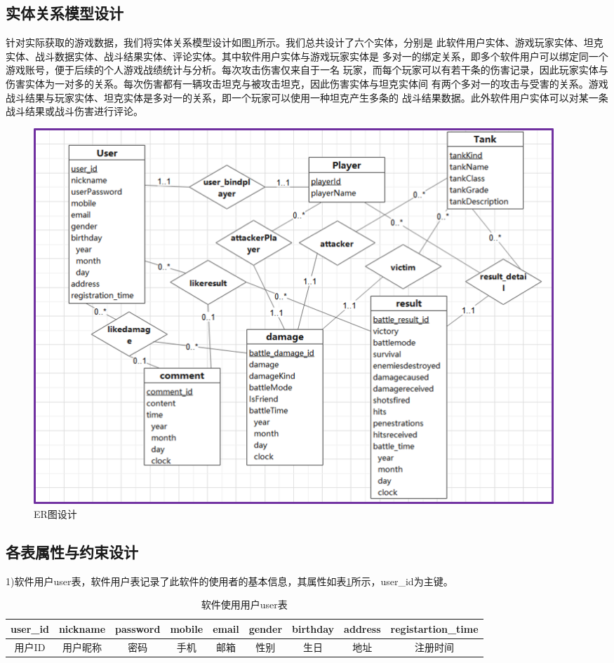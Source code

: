 \documentclass[UTF8, a4paper]{ctexart}
\begin{document}
\subsection{实体关系模型设计}
针对实际获取的游戏数据，我们将实体关系模型设计如图\ref{fig:erd}所示。我们总共设计了六个实体，分别是
此软件用户实体、游戏玩家实体、坦克实体、战斗数据实体、战斗结果实体、评论实体。其中软件用户实体与游戏玩家实体是
多对一的绑定关系，即多个软件用户可以绑定同一个游戏账号，便于后续的个人游戏战绩统计与分析。每次攻击伤害仅来自于一名
玩家，而每个玩家可以有若干条的伤害记录，因此玩家实体与伤害实体为一对多的关系。每次伤害都有一辆攻击坦克与被攻击坦克，因此伤害实体与坦克实体间
有两个多对一的攻击与受害的关系。游戏战斗结果与玩家实体、坦克实体是多对一的关系，即一个玩家可以使用一种坦克产生多条的
战斗结果数据。此外软件用户实体可以对某一条战斗结果或战斗伤害进行评论。
 \begin{figure}[h] %
    \centering
    \includegraphics[width=0.95\textwidth]{erd.png}
    \caption{ER图设计}
    \label{fig:erd}
  \end{figure}
\subsection{各表属性与约束设计}

1)软件用户user表，软件用户表记录了此软件的使用者的基本信息，其属性如表\ref{tab:user}所示，user\_id为主键。
\begin{table}[H]
\centering
\caption{软件使用用户user表}\label{tab:user}
\begin{tabular}{|c|c|c|c|c|c|c|c|c|}\hline
user\_id&nickname&password&mobile&email&gender&birthday&address&registartion\_time \\\hline
用户ID&用户昵称&密码&手机&邮箱&性别&生日&地址&注册时间\\\hline
\end{tabular}
\end{table}
\end{document}
